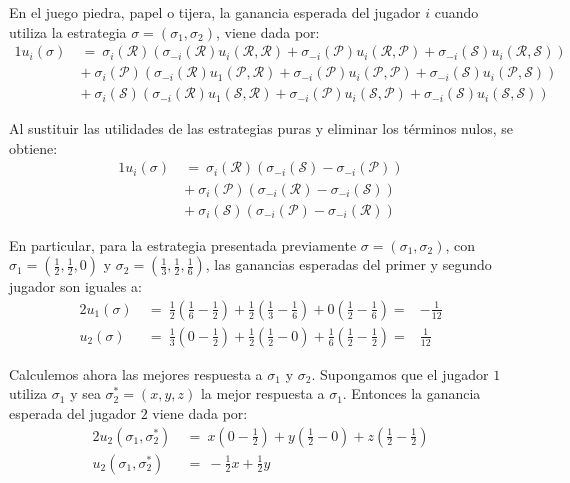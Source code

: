 En el juego piedra, papel o tijera, la ganancia esperada del jugador $i$ cuando utiliza la estrategia $\sigma = (\sigma_1, \sigma_2)$, viene dada por:
\begin{alignat}{1}
	u_i(\sigma)\ &=\ \sigma_i(\mathcal{R}) \left( \sigma_{-i}(\mathcal{R}) u_i(\mathcal{R}, \mathcal{R}) + \sigma_{-i}(\mathcal{P}) u_i(\mathcal{R}, \mathcal{P})+ \sigma_{-i}(\mathcal{S}) u_i(\mathcal{R}, \mathcal{S}) \right) \\ \nonumber
    &+\ \sigma_i(\mathcal{P}) \left(\sigma_{-i}(\mathcal{R}) u_1(\mathcal{P}, \mathcal{R}) + \sigma_{-i}(\mathcal{P}) u_i(\mathcal{P}, \mathcal{P})+ \sigma_{-i}(\mathcal{S}) u_i(\mathcal{P}, \mathcal{S})\right) \\ \nonumber
	&+\ \sigma_i(\mathcal{S}) \left(  \sigma_{-i}(\mathcal{R})  u_1(\mathcal{S}, \mathcal{R}) + \sigma_{-i}(\mathcal{P}) u_i(\mathcal{S}, \mathcal{P})+ \sigma_{-i}(\mathcal{S}) u_i(\mathcal{S}, \mathcal{S})\right)
\end{alignat}

Al sustituir las utilidades de las estrategias puras y eliminar los términos nulos, se obtiene:
\begin{alignat}{1}
	u_i(\sigma)\
	&=\ \sigma_i(\mathcal{R}) \left(\sigma_{-i}(\mathcal{S}) - \sigma_{-i}(\mathcal{P}) \right) \\ \nonumber
    &+\ \sigma_i(\mathcal{P}) \left(\sigma_{-i}(\mathcal{R}) - \sigma_{-i}(\mathcal{S}) \right) \\ \nonumber
	&+\ \sigma_i(\mathcal{S}) \left(\sigma_{-i}(\mathcal{P}) - \sigma_{-i}(\mathcal{R}) \right)
\end{alignat}

En particular, para la estrategia presentada previamente $\sigma = (\sigma_1, \sigma_2)$, con $\sigma_1 = \left( \frac{1}{2}, \frac{1}{2}, 0 \right)$ y $\sigma_2 = \left(\frac{1}{3}, \frac{1}{2}, \frac{1}{6} \right)$, las ganancias esperadas del primer y segundo jugador son iguales a:
\begin{alignat}{2}
    u_1(\sigma)\ &=\ \frac{1}{2} \left(\frac{1}{6} - \frac{1}{2}\right) + \frac{1}{2} \left( \frac{1}{3} -\frac{1}{6} \right) + 0 \left( \frac{1}{2} - \frac{1}{6} \right) =& -\frac{1}{12} \\
    u_2(\sigma)\ &=\ \frac{1}{3}\left(0 -\frac{1}{2} \right) + \frac{1}{2} \left( \frac{1}{2} - 0 \right) + \frac{1}{6} \left( \frac{1}{2} - \frac{1}{2} \right) =& \frac{1}{12}
\end{alignat}

Calculemos ahora las mejores respuesta a $\sigma_1$ y $\sigma_2$. Supongamos que el jugador $1$ utiliza $\sigma_1$ y sea $\sigma^*_2 = (x, y, z)$ la mejor respuesta a $\sigma_1$. Entonces la ganancia esperada del jugador $2$ viene dada por:
\begin{alignat}{2}
u_2(\sigma_1, \sigma^*_2)\ &=\ x\left(0 -\frac{1}{2}\right) + y\left(\frac{1}{2} - 0\right) + z\left(\frac{1}{2} - \frac{1}{2}\right) \\
u_2(\sigma_1, \sigma^*_2)\ &=\ -\frac{1}{2}x + \frac{1}{2}y
\end{alignat}

